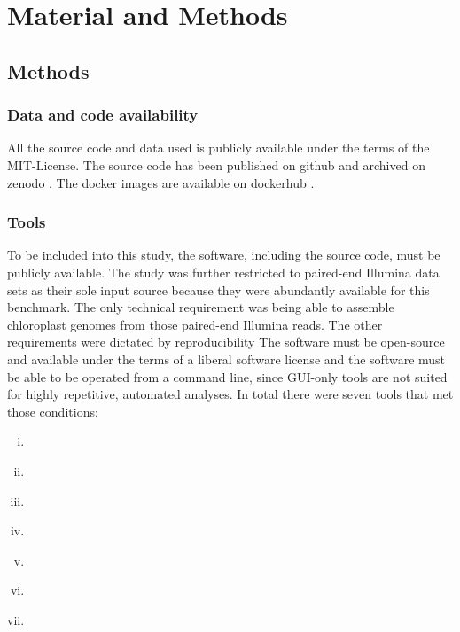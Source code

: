 \section{Material and Methods}
\subsection{Methods}
\subsubsection{Data and code availability}
All the source code and data used is publicly available under the terms of the MIT-License. The source code
has been published on github \cite{github-benchmark-repo} and archived on zenodo \cite{zenodorepo} . The
docker images are available on dockerhub \cite{dockerhub-benchmark}.

\subsubsection{Tools}
To be included into this study, the software, including the source code, must be publicly
available. The study was further restricted to paired-end Illumina data sets as their sole
input source because they were abundantly available for this benchmark.  The only
technical requirement was being able to assemble chloroplast genomes from those paired-end
Illumina reads. The other requirements were dictated by reproducibility The software must
be open-source and available under the terms of a liberal software license and the
software must be able to be operated from a command line, since GUI-only tools are not
suited for highly repetitive, automated analyses. In total there were seven tools that met
those conditions:

\begin{enumerate}[(i)]
\item \ce \hspace{0.25ex} \cite{j_ankenbrand_chloroextractor:_2018}
\item \cassp \hspace{0.25ex} \cite{sancho_comparative_2018}
\item \go \hspace{0.25ex} \cite{jin_getorganelle:_2018}
\item \oa \hspace{0.25ex} \cite{coissac_barcodes_2016}
\item \ioga \hspace{0.25ex} \cite{bakker_herbarium_2016}
\item \fp \hspace{0.25ex} \cite{mckain__fast-plast_2017}
\item \np \hspace{0.25ex} \cite{dierckxsens_novoplasty:_2017}
\end{enumerate}


